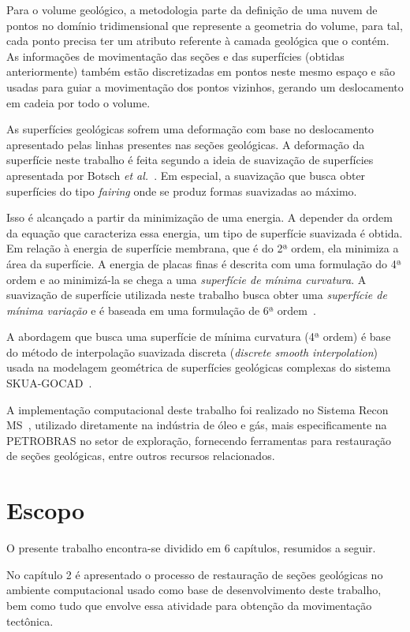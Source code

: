 Para o volume geológico, a metodologia parte da definição de uma nuvem de pontos no domínio tridimensional que represente a geometria do volume, para tal, cada ponto precisa ter um atributo referente à camada geológica que o contém. As informações de movimentação das seções e das superfícies (obtidas anteriormente) também estão discretizadas em pontos neste mesmo espaço e são usadas para guiar a movimentação dos pontos vizinhos, gerando um deslocamento em cadeia por todo o volume.

As superfícies geológicas sofrem uma deformação com base no deslocamento apresentado pelas linhas presentes nas seções geológicas. A deformação da superfície neste trabalho é feita segundo a ideia de suavização de superfícies apresentada por Botsch \emph{et al.}~\cite{Botsch}. Em especial, a suavização que busca obter superfícies do tipo \emph{fairing} onde se produz formas suavizadas ao máximo.

Isso é alcançado a partir da minimização de uma energia. A depender da ordem da equação que caracteriza essa energia, um tipo de superfície suavizada é obtida. Em relação à energia de superfície membrana, que é do 2ª ordem, ela minimiza a área da superfície. A energia de placas finas é descrita com uma formulação do 4ª ordem e ao minimizá-la se chega a uma \emph{superfície de mínima curvatura}. A suavização de superfície utilizada neste trabalho busca obter uma \emph{superfície de mínima variação} e é baseada em uma formulação de 6ª ordem~\cite{Botsch}.

A abordagem que busca uma superfície de mínima curvatura (4ª ordem) é base do método de interpolação suavizada discreta (\emph{discrete smooth interpolation})~\cite{DSI} usada na modelagem geométrica de superfícies geológicas complexas do sistema SKUA-GOCAD~\cite{GOCAD}.

A implementação computacional deste trabalho foi realizado no Sistema Recon MS~\cite{ReconTecgraf}, utilizado diretamente na indústria de óleo e gás, mais especificamente na PETROBRAS no setor de exploração, fornecendo ferramentas para restauração de seções geológicas, entre outros recursos relacionados.

\section{Escopo}

O presente trabalho encontra-se dividido em 6 capítulos, resumidos a seguir.

No capítulo 2 é apresentado o processo de restauração de seções geológicas no ambiente computacional usado como base de desenvolvimento deste trabalho, bem como tudo que envolve essa atividade para obtenção da movimentação tectônica.

